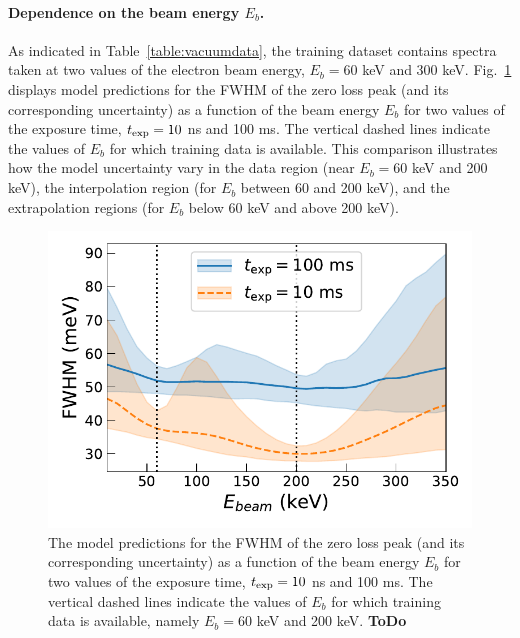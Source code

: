 \paragraph{Dependence on the beam energy $E_b$.}
%
As indicated in Table~\ref{table:vacuumdata}, the training dataset contains
spectra taken at two values of the electron beam energy, $E_b=60$ keV and 300 keV.
%
Fig.~\ref{fig:extrapolbeam} displays  model predictions for the FWHM of the zero loss peak
      (and its corresponding uncertainty) as a function of the beam energy $E_b$
      for two values of the exposure time, $t_{\rm exp}=10$ ns and 100 ms.
      The vertical dashed lines indicate the values of $E_b$ for which training data is available.
      This comparison illustrates how the model uncertainty vary in the data region
      (near $E_b=60$ keV and 200 keV), the interpolation region (for $E_b$ between 60 and 200 keV),
      and the extrapolation regions (for $E_b$ below 60 keV and above 200 keV).
      
\begin{figure}[t]
    \centering
    \includegraphics[width=130mm]{plots/Ebeam_extrapolation.pdf}
    \caption{The model predictions for the FWHM of the zero loss peak
      (and its corresponding uncertainty) as a function of the beam energy $E_b$
      for two values of the exposure time, $t_{\rm exp}=10$ ns and 100 ms.
      The vertical dashed lines indicate the values of $E_b$ for which training data is available,
      namely $E_b=60$ keV and 200 keV. {\bf ToDo}
    }
    \label{fig:extrapolbeam}
\end{figure}

